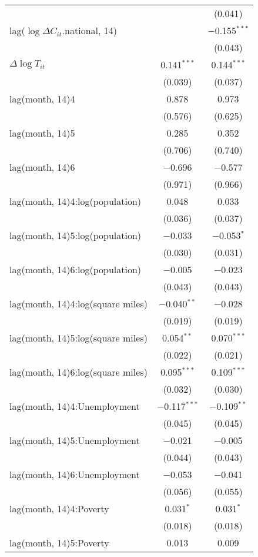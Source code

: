 \begin{tabular}{@{\extracolsep{1pt}}lcc}
  &  & (0.041) \\ 
  lag($\log \Delta C_{it}$.national, 14) &  & $-$0.155$^{***}$ \\ 
  &  & (0.043) \\ 
  $\Delta \log T_{it}$ & 0.141$^{***}$ & 0.144$^{***}$ \\ 
  & (0.039) & (0.037) \\ 
  lag(month, 14)4 & 0.878 & 0.973 \\ 
  & (0.576) & (0.625) \\ 
  lag(month, 14)5 & 0.285 & 0.352 \\ 
  & (0.706) & (0.740) \\ 
  lag(month, 14)6 & $-$0.696 & $-$0.577 \\ 
  & (0.971) & (0.966) \\ 
  lag(month, 14)4:log(population) & 0.048 & 0.033 \\ 
  & (0.036) & (0.037) \\ 
  lag(month, 14)5:log(population) & $-$0.033 & $-$0.053$^{*}$ \\ 
  & (0.030) & (0.031) \\ 
  lag(month, 14)6:log(population) & $-$0.005 & $-$0.023 \\ 
  & (0.043) & (0.043) \\ 
  lag(month, 14)4:log(square miles) & $-$0.040$^{**}$ & $-$0.028 \\ 
  & (0.019) & (0.019) \\ 
  lag(month, 14)5:log(square miles) & 0.054$^{**}$ & 0.070$^{***}$ \\ 
  & (0.022) & (0.021) \\ 
  lag(month, 14)6:log(square miles) & 0.095$^{***}$ & 0.109$^{***}$ \\ 
  & (0.032) & (0.030) \\ 
  lag(month, 14)4:Unemployment & $-$0.117$^{***}$ & $-$0.109$^{**}$ \\ 
  & (0.045) & (0.045) \\ 
  lag(month, 14)5:Unemployment & $-$0.021 & $-$0.005 \\ 
  & (0.044) & (0.043) \\ 
  lag(month, 14)6:Unemployment & $-$0.053 & $-$0.041 \\ 
  & (0.056) & (0.055) \\ 
  lag(month, 14)4:Poverty & 0.031$^{*}$ & 0.031$^{*}$ \\ 
  & (0.018) & (0.018) \\ 
  lag(month, 14)5:Poverty & 0.013 & 0.009 \\ 

\end{tabular}
